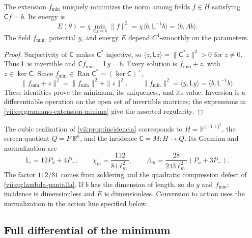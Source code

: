 \begin{proposition}
\label{vii:prop:minimo-parametrizado}
The extension \(f_{\min}\) uniquely minimizes the norm among
fields \(f\in H\) satisfying \(\mathsf C f=b\). Its energy is
\begin{equation}
 E(\theta)=\chi\min_{\mathsf C f=b}\|f\|^2
 =\chi\langle b,\mathsf L^{-1}b\rangle
 =\langle b,\Lambda b\rangle.
 \label{vii:eq:energia-extension-minima}
\end{equation}
The field \(f_{\min}\), potential \(y\), and energy \(E\)
depend \(C^1\)-smoothly on the parameters.
\end{proposition}

\begin{proof}
Surjectivity of \(\mathsf C\) makes \(\mathsf C^*\) injective,
so \(\langle z,\mathsf Lz\rangle=\|\mathsf C^*z\|^2>0\)
for \(z\ne0\). Thus \(\mathsf L\) is invertible and
\(\mathsf C f_{\min}=\mathsf L y=b\). Every solution is
\(f_{\min}+z\), with \(z\in\ker\mathsf C\). Since
\(f_{\min}\in\operatorname{Ran}\mathsf C^*=(\ker\mathsf C)^\perp\),
\[
 \|f_{\min}+z\|^2=\|f_{\min}\|^2+\|z\|^2,
 \qquad
 \|f_{\min}\|^2=\langle y,\mathsf L y\rangle
 =\langle b,\mathsf L^{-1}b\rangle.
\]
These identities prove the minimum, its uniqueness, and its value.
Inversion is a differentiable operation on the open set of invertible
matrices; the expressions in \eqref{vii:eq:gramiano-extension-minima}
give the asserted regularity.
\end{proof}

The cubic realization of \ref{vii:prop:incidencia} corresponds to
\(H=\mathbb R^{\{-1,1\}^3}\), the screen quotient
\(Q=P_\square\mathbb R^6\), and the incidence \(\mathsf C=M:H\to Q\).
Its Gramian and normalization are
\begin{equation}
 \mathsf L_\square=12P_u+4P_-,\qquad
 \chi_m=\frac{112}{81\ell_m^2},\qquad
 \Lambda_m=\frac{28}{243\ell_m^2}(P_u+3P_-).
 \label{vii:eq:normalizacion-minimo-cubico}
\end{equation}
The factor \(112/81\) comes from soldering and the quadratic
compression defect of \eqref{vii:eq:lambda-pantalla}. If \(b\) has
the dimension of length, so do \(y\) and \(f_{\min}\); incidence
is dimensionless and \(E\) is dimensionless. Conversion to action
uses the normalization in the action line specified below.

\subsection{Full differential of the minimum}
\label{vii:subsec:diferencial-minimo}

